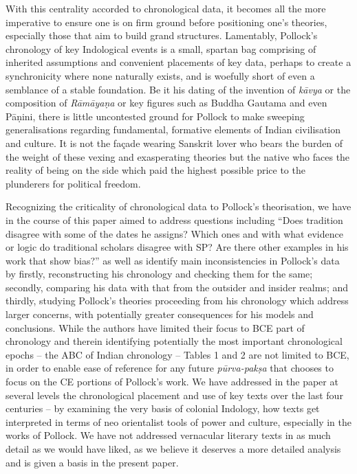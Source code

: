 With this centrality accorded to chronological data, it becomes all the more imperative to ensure one is on firm ground before positioning one’s theories, especially those that aim to build grand structures. Lamentably, Pollock’s chronology of key Indological events is a small, spartan bag comprising of inherited assumptions and convenient placements of key data, perhaps to create a synchronicity where none naturally exists, and is woefully short of even a semblance of a stable foundation. Be it his dating of the invention of \textit{kāvya} or the composition of \textit{Rāmāyaṇa} or key figures such as Buddha Gautama and even Pāṇini, there is little uncontested ground for Pollock to make sweeping generalisations regarding fundamental, formative elements of Indian civilisation and culture. It is not the façade wearing Sanskrit lover who bears the burden of the weight of these vexing and exasperating theories but the native who faces the reality of being on the side which paid the highest possible price to the plunderers for political freedom.

Recognizing the criticality of chronological data to Pollock’s theorisation, we have in the course of this paper aimed to address questions including “Does tradition disagree with some of the dates he assigns? Which ones and with what evidence or logic do traditional scholars disagree with SP? Are there other examples in his work that show bias?” as well as identify main inconsistencies in Pollock’s data by firstly, reconstructing his chronology and checking them for the same; secondly, comparing his data with that from the outsider and insider realms; and thirdly, studying Pollock’s theories proceeding from his chronology which address larger concerns, with potentially greater consequences for his models and conclusions. While the authors have limited their focus to BCE part of chronology and therein identifying potentially the most important chronological epochs – the ABC of Indian chronology – Tables 1 and 2 are not limited to BCE, in order to enable ease of reference for any future \textit{pūrva-pakṣa} that chooses to focus on the CE portions of Pollock’s work. We have addressed in the paper at several levels the chronological placement and use of key texts over the last four centuries – by examining the very basis of colonial Indology, how texts get interpreted in terms of neo orientalist tools of power and culture, especially in the works of Pollock. We have not addressed vernacular literary texts in as much detail as we would have liked, as we believe it deserves a more detailed analysis and is given a basis in the present paper.

